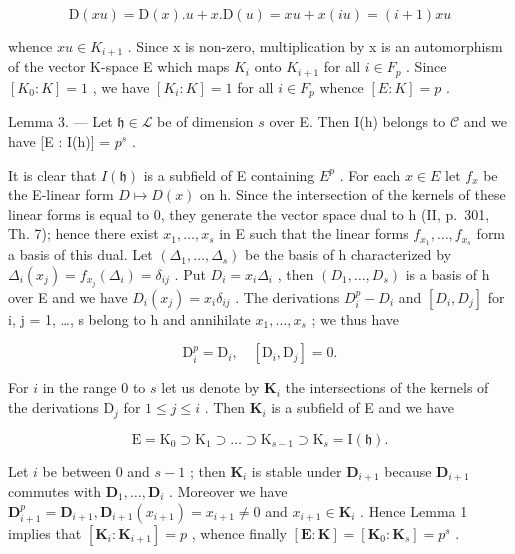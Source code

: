 \[
\mathrm{D} (x u) = \mathrm{D} (x). u + x. \mathrm{D} (u) = x u + x (i u) = (i + 1) x u
\]

whence \(xu \in K_{i+1}\) . Since x is non-zero, multiplication by x is an automorphism of the vector K-space E which maps \(K_i\) onto \(K_{i+1}\) for all \(i \in F_p\) . Since \([K_0 : K] = 1\) , we have \([K_i : K] = 1\) for all \(i \in F_p\) whence \([E : K] = p\) .

Lemma 3. --- Let \(\mathfrak{h} \in \mathcal{L}\) be of dimension \(s\) over E. Then I(h) belongs to \(\mathcal{C}\) and we have {[}E : I(h){]} = \(p^s\) .

It is clear that \(I(\mathfrak{h})\) is a subfield of E containing \(E^{p}\) . For each \(x \in E\) let \(f_{x}\) be the E-linear form \(D \mapsto D(x)\) on h. Since the intersection of the kernels of these linear forms is equal to 0, they generate the vector space dual to h (II, p.~301, Th. 7); hence there exist \(x_{1}, \ldots, x_{s}\) in E such that the linear forms \(f_{x_{1}}, \ldots, f_{x_{s}}\) form a basis of this dual. Let \((\Delta_{1}, \ldots, \Delta_{s})\) be the basis of h characterized by \(\Delta_{i}(x_{j}) = f_{x_{j}}(\Delta_{i}) = \delta_{ij}\) . Put \(D_{i} = x_{i}\Delta_{i}\) , then \((D_{1}, \ldots, D_{s})\) is a basis of h over E and we have \(D_{i}(x_{j}) = x_{i}\delta_{ij}\) . The derivations \(D_{i}^{p} - D_{i}\) and \([D_{i}, D_{j}]\) for i, j = 1, \ldots, s belong to h and annihilate \(x_{1}, \ldots, x_{s}\) ; we thus have

\[
\mathrm{D} _ {i} ^ {p} = \mathrm{D} _ {i}, \quad [ \mathrm{D} _ {i}, \mathrm{D} _ {j} ] = 0.\tag{10}
\]

For \(i\) in the range 0 to \(s\) let us denote by \(\mathbf{K}_i\) the intersections of the kernels of the derivations \(\mathrm{D}_j\) for \(1 \leqslant j \leqslant i\) . Then \(\mathbf{K}_i\) is a subfield of E and we have

\[
\mathrm{E} = {\mathrm{K}} _ {0} \supset \mathrm{K} _ {1} \supset \dots \supset \mathrm{K} _ {s - 1} \supset \mathrm{K} _ {s} = \mathrm{I} (\mathfrak {h}).
\]

Let \(i\) be between 0 and \(s-1\) ; then \(\mathbf{K}_{i}\) is stable under \(\mathbf{D}_{i+1}\) because \(\mathbf{D}_{i+1}\) commutes with \(\mathbf{D}_{1}, \ldots, \mathbf{D}_{i}\) . Moreover we have \(\mathbf{D}_{i+1}^{p} = \mathbf{D}_{i+1}, \mathbf{D}_{i+1}(x_{i+1}) = x_{i+1} \neq 0\) and \(x_{i+1} \in \mathbf{K}_{i}\) . Hence Lemma 1 implies that \([\mathbf{K}_{i}: \mathbf{K}_{i+1}] = p\) , whence finally \([\mathbf{E}: \mathbf{K}] = [\mathbf{K}_{0}: \mathbf{K}_{s}] = p^{s}\) .

